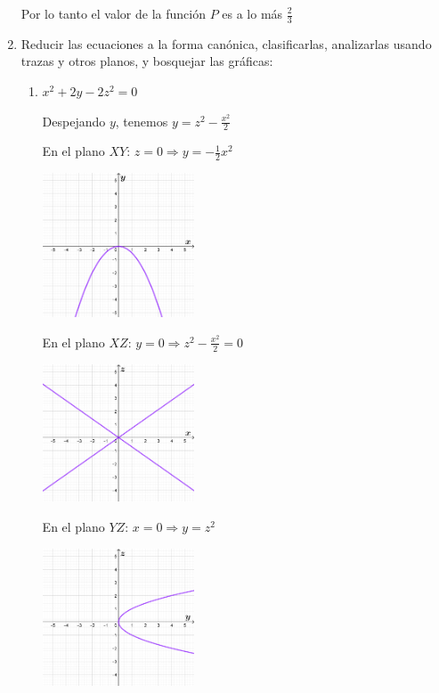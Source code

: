 \documentclass{article}
\begin{document}
\begin{enumerate}
{                Por lo tanto el valor de la función $P$ es a lo más $\frac{2}{3}$
            }
            \item {
                Reducir las ecuaciones a la forma canónica, clasificarlas, analizarlas
                usando trazas y otros planos, y bosquejar las gráficas:
                \begin{enumerate}
                    \item{
                        $x^2+2y-2z^2=0$
                        
                        \color{azul}
                        Despejando $y$, tenemos $\displaystyle y=z^2-\frac{x^2}{2}$
                        
                        En el plano $XY$: $z=0 \Rightarrow y=-\frac{1}{2}x^2$
                        \begin{center}
                            \includegraphics[width=4.5cm]{img/7a1.png}
                        \end{center}
                        En el plano $XZ$: $y=0 \Rightarrow z^2-\frac{x^2}{2}=0$
                        \begin{center}
                            \includegraphics[width=4.5cm]{img/7a2.png}
                        \end{center}
                        En el plano $YZ$: $x=0 \Rightarrow y=z^2$
                        \begin{center}
                            \includegraphics[width=4.5cm]{img/7a3.png}

\end{center}}
\end{enumerate}}
\end{enumerate}
\end{document}
